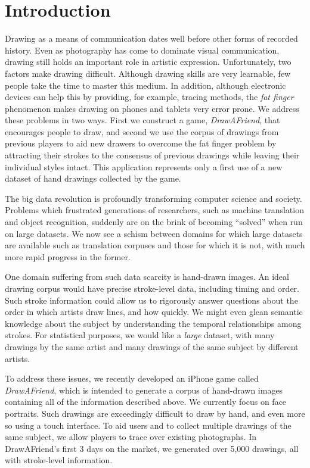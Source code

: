 \section{Introduction}

Drawing as a means of communication dates well before other forms of
recorded history. Even as photography has come to dominate visual
communication, drawing still holds an important role in artistic
expression. Unfortunately, two factors make drawing difficult.
Although drawing skills are very learnable, few people take the time
to master this medium. In addition, although electronic devices can
help this by providing, for example, tracing methods, the {\em fat
finger} phenomenon makes drawing on phones and tablets very error
prone. We address these problems in two ways. First we construct a
game, {\em DrawAFriend}, that encourages people to draw, 
and second we use the corpus of
drawings from previous players to aid new drawers to overcome
the fat finger problem by attracting their strokes to the consensus of
previous drawings while leaving their individual styles intact. This
application represents only a first use of a new dataset of hand
drawings collected by the game.

The big data revolution is profoundly transforming computer science
and society. Problems which frustrated generations of researchers,
such as machine translation and object recognition, suddenly are on
the brink of becoming ``solved'' when run on large datasets. We now
see a schism between domains for which large datasets are available
such as translation corpuses and those for which it is not,
with much more rapid progress in the former.

One domain suffering from such data scarcity is hand-drawn images.
An ideal drawing corpus would have precise stroke-level data,
including timing and order. Such stroke information could allow us
to rigorously answer questions about the order in which artists draw
lines, and how quickly. We might even glean semantic knowledge about
the subject by understanding the temporal relationships among
strokes. For statistical purposes, we would like a \emph{large}
dataset, with many drawings by the same artist and many drawings of
the same subject by different artists.

To address these issues, we recently developed an iPhone game called
\emph{DrawAFriend}, which is intended to generate a corpus of
hand-drawn images containing all of the information described above.
We currently focus on face portraits. Such drawings are exceedingly
difficult to draw by hand, and even more so using a touch interface.
To aid users and to collect multiple drawings of the same subject,
we allow players to trace over existing photographs. In DrawAFriend's first 3 days on the market,
we generated over 5,000 drawings, all with stroke-level information.

